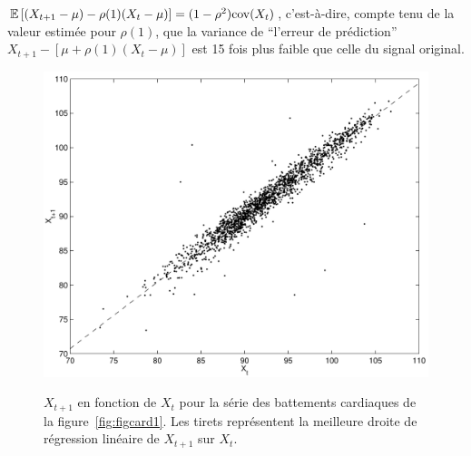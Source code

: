  ${\mathbb E}\left[ (X_{t+1}-\mu)-\rho(1)(X_t-\mu) \right] = (1-\rho^2) \mathrm{cov}(X_t)$, c'est-\`a-dire,
 compte tenu de la valeur estim\'ee pour $\rho(1)$, que la variance de ``l'erreur
 de pr\'ediction'' $X_{t+1}-[\mu+\rho(1)(X_t-\mu)]$ est 15 fois plus faible que
 celle du signal original.
\begin{figure}
  \centering
  \includegraphics[width=\textwidth]{Figures/cov_hr11839}\\
  \caption{$X_{t+1}$ en fonction de $X_t$ pour la s\'erie
 des battements cardiaques de la figure~\ref{fig:figcard1}. Les tirets
 repr\'esentent la meilleure droite de r\'egression lin\'eaire de $X_{t+1}$ sur $X_t$.}
 \label{fig:xcov}
\end{figure}

